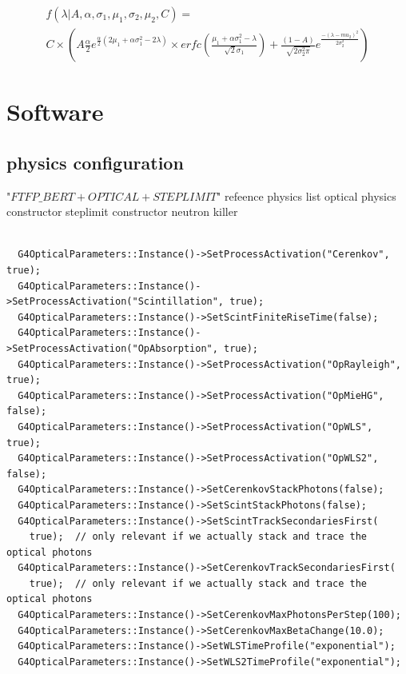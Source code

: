 \documentclass{article}
\begin{document}
\begin{multline}
  f (\lambda | A, \alpha, \sigma_1 , \mu_{1} , \sigma_{2} , \mu_{2}, C ) =\\
  C \times \left(
  A \frac{\alpha}{2} e^{ \frac{\alpha}{2} ( 2 \mu_{1} +\alpha \sigma_{1}^{2} - 2 \lambda) }
  \times  erfc\left( \frac{\mu_{1} + \alpha \sigma_{1}^{2} - \lambda}{\sqrt{2} \sigma_{1}} \right)
  + \frac{(1 - A)}{\sqrt{2 \sigma_{2}^{2}\pi} }  e^{\frac{-(\lambda -mu_{2})^{2}}{2 \sigma_{2}^{2}}}
  \right)
  \label{equ:wls}
\end{multline}

\section{Software}
\subsection{physics configuration}

"$FTFP\_BERT+OPTICAL+STEPLIMIT$"
refeence physics list
optical physics constructor
steplimit constructor
neutron killer 
\begin{verbatim}

  G4OpticalParameters::Instance()->SetProcessActivation("Cerenkov", true);
  G4OpticalParameters::Instance()->SetProcessActivation("Scintillation", true);
  G4OpticalParameters::Instance()->SetScintFiniteRiseTime(false);
  G4OpticalParameters::Instance()->SetProcessActivation("OpAbsorption", true);
  G4OpticalParameters::Instance()->SetProcessActivation("OpRayleigh", true);
  G4OpticalParameters::Instance()->SetProcessActivation("OpMieHG", false);
  G4OpticalParameters::Instance()->SetProcessActivation("OpWLS", true);
  G4OpticalParameters::Instance()->SetProcessActivation("OpWLS2", false);
  G4OpticalParameters::Instance()->SetCerenkovStackPhotons(false);
  G4OpticalParameters::Instance()->SetScintStackPhotons(false);
  G4OpticalParameters::Instance()->SetScintTrackSecondariesFirst(
    true);  // only relevant if we actually stack and trace the optical photons
  G4OpticalParameters::Instance()->SetCerenkovTrackSecondariesFirst(
    true);  // only relevant if we actually stack and trace the optical photons
  G4OpticalParameters::Instance()->SetCerenkovMaxPhotonsPerStep(100);
  G4OpticalParameters::Instance()->SetCerenkovMaxBetaChange(10.0);
  G4OpticalParameters::Instance()->SetWLSTimeProfile("exponential");
  G4OpticalParameters::Instance()->SetWLS2TimeProfile("exponential");

\end{verbatim}
\end{document}
